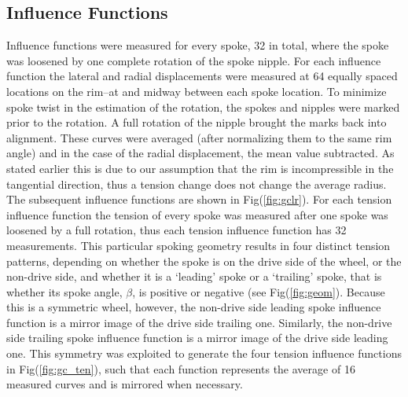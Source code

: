 \documentclass[journal]{IEEEtran}
\begin{document}
\subsection{Influence Functions}
Influence functions were measured for every spoke, 32 in total, where the spoke was loosened by one complete rotation of the spoke nipple. For each influence function the lateral and radial displacements were measured at 64 equally spaced locations on the rim--at  and midway between each spoke location. To minimize spoke twist in the estimation of the rotation, the spokes and nipples were marked prior to the rotation. A full rotation of the nipple brought the marks back into alignment. These curves were averaged (after normalizing them to the same rim angle) and in the case of the radial displacement, the mean value subtracted. As stated earlier this is due to our assumption that the rim is incompressible in the tangential direction, thus a tension change does not change the average radius.  The subsequent influence functions are shown in Fig(\ref{fig:gclr}).  For each tension influence function the tension of every spoke was measured after one spoke was loosened by a full rotation, thus each tension influence function has 32 measurements. This particular spoking geometry results in four distinct tension patterns, depending on whether the spoke is on the drive side of the wheel, or the non-drive side, and whether it is a `leading' spoke or a `trailing' spoke, that is whether its spoke angle, $\beta$, is positive or negative (see Fig(\ref{fig:geom}).  Because this is a symmetric wheel, however, the non-drive side leading spoke influence function is a mirror image of the drive side trailing one.  Similarly, the non-drive side trailing spoke influence function is a mirror image of the drive side leading one. This symmetry was exploited to generate the four tension influence functions in Fig(\ref{fig:gc_ten}), such that each function represents the average of 16 measured curves and is mirrored when necessary.
\end{document}
